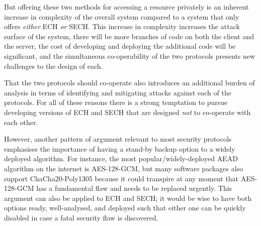 But offering these two methods for accessing a resource privately
is an inherent increase in complexity of the overall system compared to a system that only offers {\em either}
\ac{ECH} {\em or} \ac{SECH}.
This increase in complexity increases the attack surface of the system,
there will be more branches of code on both the client and the server,
the cost of developing and deploying the additional code will be significant,
and the simultaneous co-operability of the two protocols presents new challenges to the design of each.

That the two protocols should co-operate also introduces an additional burden of analysis in terms of identifying and mitigating attacks against each of the protocols.
For all of these reasons there is a strong temptation to pursue developing versions of \ac{ECH} and \ac{SECH} that are designed {\em not} to co-operate with each other.

However, another pattern of argument relevant to most security protocols emphasises the importance of having a stand-by backup option to a widely deployed algorithm.
For instance, the most popular/widely-deployed \ac{AEAD} algorithm on the internet is AES-128-GCM,
but many software packages also support ChaCha20-Poly1305 because it could transpire
at any moment that AES-128-GCM has a fundamental flaw and needs to be replaced urgently.
This argument can also be applied to \ac{ECH} and \ac{SECH};
it would be wise to have both options ready, well-analysed, and deployed such that either one can be quickly disabled in case a fatal security flaw is discovered.

